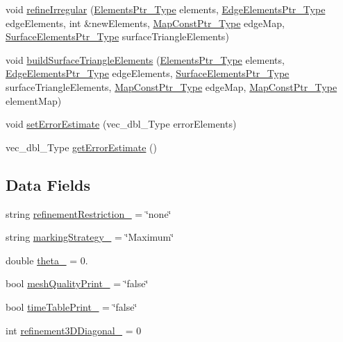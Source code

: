 \begin{DoxyCompactItemize}
\item 
void \hyperlink{classFEDD_1_1RefinementFactory_ae4401ece866b918923322d46d0c5e33e}{refine\+Irregular} (\hyperlink{classFEDD_1_1RefinementFactory_a0994b5b7b6d080048673941251999f2e}{Elements\+Ptr\+\_\+\+Type} elements, \hyperlink{classFEDD_1_1RefinementFactory_ae5285e990ec4632d6188a1280627ad13}{Edge\+Elements\+Ptr\+\_\+\+Type} edge\+Elements, int \&new\+Elements, \hyperlink{classFEDD_1_1RefinementFactory_a8256ccdf1b2a5c977ddc011f4e8eb8d3}{Map\+Const\+Ptr\+\_\+\+Type} edge\+Map, \hyperlink{classFEDD_1_1RefinementFactory_a1067ba23325b19eae16a864f25f7d68f}{Surface\+Elements\+Ptr\+\_\+\+Type} surface\+Triangle\+Elements)
\item 
void \hyperlink{classFEDD_1_1RefinementFactory_a0393fc1497f3b0e02380af00b93e96d6}{build\+Surface\+Triangle\+Elements} (\hyperlink{classFEDD_1_1RefinementFactory_a0994b5b7b6d080048673941251999f2e}{Elements\+Ptr\+\_\+\+Type} elements, \hyperlink{classFEDD_1_1RefinementFactory_ae5285e990ec4632d6188a1280627ad13}{Edge\+Elements\+Ptr\+\_\+\+Type} edge\+Elements, \hyperlink{classFEDD_1_1RefinementFactory_a1067ba23325b19eae16a864f25f7d68f}{Surface\+Elements\+Ptr\+\_\+\+Type} surface\+Triangle\+Elements, \hyperlink{classFEDD_1_1RefinementFactory_a8256ccdf1b2a5c977ddc011f4e8eb8d3}{Map\+Const\+Ptr\+\_\+\+Type} edge\+Map, \hyperlink{classFEDD_1_1RefinementFactory_a8256ccdf1b2a5c977ddc011f4e8eb8d3}{Map\+Const\+Ptr\+\_\+\+Type} element\+Map)
\item 
void \hyperlink{classFEDD_1_1RefinementFactory_a4532ed5c403d767f316e922a3d769853}{set\+Error\+Estimate} (vec\+\_\+dbl\+\_\+\+Type error\+Elements)
\item 
vec\+\_\+dbl\+\_\+\+Type \hyperlink{classFEDD_1_1RefinementFactory_aecc0c9142abed8227daa43fc5db6ae1c}{get\+Error\+Estimate} ()
\end{DoxyCompactItemize}
\subsection*{Data Fields}
\begin{DoxyCompactItemize}
\item 
string \hyperlink{classFEDD_1_1RefinementFactory_a2dda98963313023311f044d248befd40}{refinement\+Restriction\+\_\+} = \char`\"{}none\char`\"{}
\item 
string \hyperlink{classFEDD_1_1RefinementFactory_aa499fe1f4daaed1c19fd1744d73c3706}{marking\+Strategy\+\_\+} = \char`\"{}Maximum\char`\"{}
\item 
double \hyperlink{classFEDD_1_1RefinementFactory_aac84121e72b1c2c6ff1691dc91acc9b1}{theta\+\_\+} = 0.
\item 
bool \hyperlink{classFEDD_1_1RefinementFactory_a74d0dd46b30f83f868cd749d28375a42}{mesh\+Quality\+Print\+\_\+} = \char`\"{}false\char`\"{}
\item 
bool \hyperlink{classFEDD_1_1RefinementFactory_ad7ff86aebffde685089d462f2d04203e}{time\+Table\+Print\+\_\+} = \char`\"{}false\char`\"{}
\item 
int \hyperlink{classFEDD_1_1RefinementFactory_a7466053f06c1d52d6fb2c58db06b7a71}{refinement3\+D\+Diagonal\+\_\+} = 0
\end{DoxyCompactItemize}
